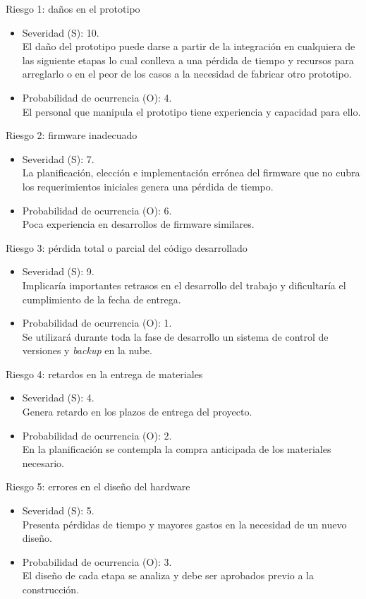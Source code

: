 \documentclass[11pt]{charter}
\begin{document}
 
Riesgo 1: daños en el prototipo
\begin{itemize}
\item Severidad (S): 10.\\
El daño del prototipo puede darse a partir de la integración en cualquiera de las siguiente etapas lo cual conlleva a una pérdida de tiempo y recursos para arreglarlo o en el peor de los casos a la necesidad de fabricar otro prototipo.
\item Probabilidad de ocurrencia (O): 4.\\
El personal que manipula el prototipo tiene experiencia y capacidad para ello. 
\end{itemize}   

Riesgo 2: firmware inadecuado
\begin{itemize}
\item Severidad (S): 7.\\
La planificación, elección e implementación errónea del firmware que no cubra los requerimientos iniciales genera una pérdida de tiempo.
\item Probabilidad de ocurrencia (O): 6.\\
Poca experiencia en desarrollos de firmware similares. 
\end{itemize}

Riesgo 3: pérdida total o parcial del código desarrollado
\begin{itemize}
\item Severidad (S): 9.\\
Implicaría importantes retrasos en el desarrollo del trabajo y dificultaría el cumplimiento de la fecha de entrega.
\item Probabilidad de ocurrencia (O): 1.\\
Se utilizará durante toda la fase de desarrollo un sistema de control de versiones y \textit{backup} en la nube.
\end{itemize}

Riesgo 4: retardos en la entrega de materiales
\begin{itemize}
\item Severidad (S): 4.\\
Genera retardo en los plazos de entrega del proyecto.
\item Probabilidad de ocurrencia (O): 2.\\
En la planificación se contempla la compra anticipada de los materiales necesario.
\end{itemize}

Riesgo 5: errores en el diseño del hardware 
\begin{itemize}
\item Severidad (S): 5.\\
Presenta pérdidas de tiempo y mayores gastos en la necesidad de un nuevo diseño.
\item Probabilidad de ocurrencia (O): 3.\\
El diseño de cada etapa se analiza y debe ser aprobados previo a la construcción. 
\end{itemize}
\end{document}
